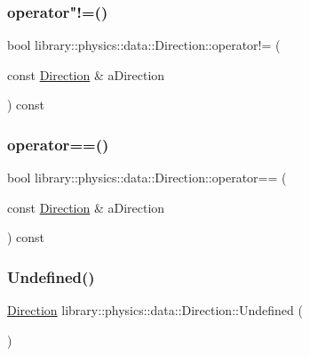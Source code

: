 \subsubsection{\texorpdfstring{operator"!=()}{operator!=()}}
{\footnotesize\ttfamily bool library\+::physics\+::data\+::\+Direction\+::operator!= (\begin{DoxyParamCaption}\item[{const \hyperlink{classlibrary_1_1physics_1_1data_1_1_direction}{Direction} \&}]{a\+Direction }\end{DoxyParamCaption}) const}

\mbox{\label{classlibrary_1_1physics_1_1data_1_1_direction_af943970f99affb310f94e16ce55b455b}} 
\subsubsection{\texorpdfstring{operator==()}{operator==()}}
{\footnotesize\ttfamily bool library\+::physics\+::data\+::\+Direction\+::operator== (\begin{DoxyParamCaption}\item[{const \hyperlink{classlibrary_1_1physics_1_1data_1_1_direction}{Direction} \&}]{a\+Direction }\end{DoxyParamCaption}) const}

\mbox{\label{classlibrary_1_1physics_1_1data_1_1_direction_afe2e1478e49419a3554a5e0de6ea2e70}} 
\subsubsection{\texorpdfstring{Undefined()}{Undefined()}}
{\footnotesize\ttfamily \hyperlink{classlibrary_1_1physics_1_1data_1_1_direction}{Direction} library\+::physics\+::data\+::\+Direction\+::\+Undefined (\begin{DoxyParamCaption}{ }\end{DoxyParamCaption})\hspace{0.3cm}{\ttfamily [static]}}



